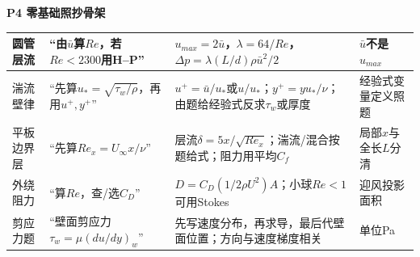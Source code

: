 \documentclass[UTF8,a4paper]{ctexart}
\newcommand{\ftitle}[1]{\vspace{1pt}\textbf{\textcolor{B}{#1}}\par\vspace{0.5pt}}
\begin{document}
\ftitle{P4 零基础照抄骨架}
\begin{tabular}{|L{0.16\textwidth}|L{0.25\textwidth}|L{0.36\textwidth}|L{0.18\textwidth}|}\hline
圆管层流 & “由$\bar u$算$Re$，若$Re<2300$用H--P” & $u_{max}=2\bar u$，$\lambda=64/Re$，$\Delta p=\lambda(L/d)\rho\bar u^2/2$ & $\bar u$不是$u_{max}$\\\hline
湍流壁律 & “先算$u_*=\sqrt{\tau_w/\rho}$，再用$u^+,y^+$” & $u^+=\bar u/u_*$或$u/u_*$；$y^+=yu_*/\nu$；由题给经验式反求$\tau_w$或厚度 & 经验式变量定义照题\\\hline
平板边界层 & “先算$Re_x=U_\infty x/\nu$” & 层流$\delta=5x/\sqrt{Re_x}$；湍流/混合按题给式；阻力用平均$C_f$ & 局部$x$与全长$L$分清\\\hline
外绕阻力 & “算$Re$，查/选$C_D$” & $D=C_D(1/2\rho U^2)A$；小球$Re<1$可用Stokes & 迎风投影面积\\\hline
剪应力题 & “壁面剪应力$\tau_w=\mu(du/dy)_w$” & 先写速度分布，再求导，最后代壁面位置；方向与速度梯度相关 & 单位Pa\\\hline
\end{tabular}
\newpage
\end{document}
